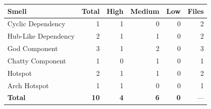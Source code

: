 \begin{tabular}{l|r|r|r|r|r}
\hline
\textbf{Smell} & \textbf{Total} & \textbf{High} & \textbf{Medium} & \textbf{Low} & \textbf{Files} \\
\hline
Cyclic Dependency & 1 & 1 & 0 & 0 & 2 \\
Hub-Like Dependency & 2 & 1 & 1 & 0 & 2 \\
God Component & 3 & 1 & 2 & 0 & 3 \\
Chatty Component & 1 & 0 & 1 & 0 & 1 \\
Hotspot & 2 & 1 & 1 & 0 & 2 \\
Arch Hotspot & 1 & 1 & 0 & 0 & 1 \\
\hline
\textbf{Total}       & \textbf{10} & \textbf{4} & \textbf{6} & \textbf{0} & --- \\
\hline
\end{tabular}
